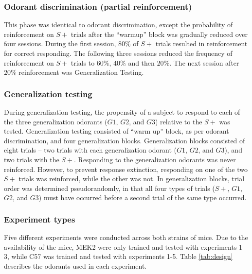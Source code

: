 \subsubsection{Odorant discrimination (partial reinforcement)}
\label{sec:methods_discrimination}
This phase was identical to odorant discrimination, except the probability of reinforcement on $S+$ trials after the ``warmup'' block was gradually reduced over four sessions. During the first session, $80\%$ of $S+$ trials resulted in reinforcement for correct responding. The following three sessions reduced the frequency of reinforcement on $S+$ trials to $60\%$, $40\%$ and then $20\%$. The next session after $20\%$ reinforcement was Generalization Testing.

\subsubsection{Generalization testing}
\label{sec:methods_training}
During generalization testing, the propensity of a subject to respond to each of the three generalization odorants ($G1$, $G2$, and $G3$) relative to the $S+$ was tested. Generalization testing consisted of ``warm up'' block, as per odorant discrimination, and four generalization blocks. Generalization blocks consisted of eight trials – two trials with each generalization odorant ($G1$, $G2$, and $G3$), and two trials with the $S+$. Responding to the generalization odorants was never reinforced. However, to prevent response extinction, responding on one of the two $S+$ trials was reinforced, while the other was not. In generalization blocks, trial order was determined pseudorandomly, in that all four types of trials ($S+$, $G1$, $G2$, and $G3$) must have occurred before a second trial of the same type occurred.

\subsubsection{Experiment types}
\label{sec:methods_experiment_types}
Five different experiments were conducted across both strains of mice. Due to the availability of the mice, MEK2 were only trained and tested with experiments 1-3, while C57 was trained and tested with experiments 1-5.  Table \ref{tab:design} describes the odorants used in each experiment.

